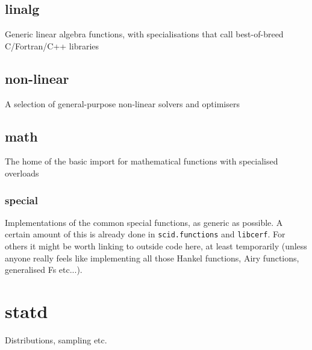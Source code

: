 \documentclass[10pt,a5paper,DIV=13]{scrartcl}
\begin{document}
\subsection{linalg}
Generic linear algebra functions, with specialisations that call best-of-breed C/Fortran/C++ libraries
\subsection{non-linear}
A selection of general-purpose non-linear solvers and optimisers
\subsection{math}
The home of the basic import for mathematical functions with specialised overloads
\subsubsection{special}
Implementations of the common special functions, as generic as possible. A certain amount of this is already done in \texttt{scid.functions} and \texttt{libcerf}. For others it might be worth linking to outside code here, at least temporarily (unless anyone really feels like implementing all those Hankel functions, Airy functions, generalised Fs etc...).

\section{statd}
Distributions, sampling etc.
\end{document}
